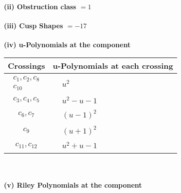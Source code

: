 \documentclass[1p]{elsarticle_modified}
\theoremstyle{definition}
\begin{document}
\flushleft \textbf{(ii) Obstruction class $= 1$}\\~\\
\flushleft \textbf{(iii) Cusp Shapes $= -17$}\\~\\
\newpage\renewcommand{\arraystretch}{1}
\flushleft \textbf{(iv) u-Polynomials at the component}\newline \\
\begin{tabular}{m{50pt}|m{274pt}}
Crossings & \hspace{64pt}u-Polynomials at each crossing \\
\hline $$\begin{aligned}c_{1},c_{2},c_{8}\\c_{10}\end{aligned}$$&$\begin{aligned}
&u^2
\end{aligned}$\\
\hline $$\begin{aligned}c_{3},c_{4},c_{5}\end{aligned}$$&$\begin{aligned}
&u^2- u-1
\end{aligned}$\\
\hline $$\begin{aligned}c_{6},c_{7}\end{aligned}$$&$\begin{aligned}
&(u-1)^2
\end{aligned}$\\
\hline $$\begin{aligned}c_{9}\end{aligned}$$&$\begin{aligned}
&(u+1)^2
\end{aligned}$\\
\hline $$\begin{aligned}c_{11},c_{12}\end{aligned}$$&$\begin{aligned}
&u^2+u-1
\end{aligned}$\\
\hline
\end{tabular}\\~\\
\newpage\renewcommand{\arraystretch}{1}
\flushleft \textbf{(v) Riley Polynomials at the component}\newline \\
\end{document}
